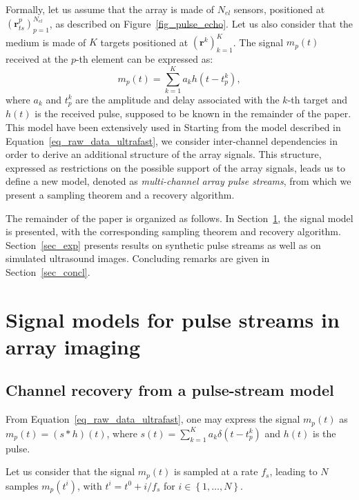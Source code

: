 \documentclass{article}
\newcommand{\vect}[1]{\bm{#1}}
\newcommand{\ser}[2]{#1^{#2}}
\theoremstyle{definition}
\begin{document}
Formally, let us assume that the array is made of $N_{el}$ sensors, positioned at $\left(\ser{\vect{r}_{ts}}{p}\right)_{p=1}^{N_{el}}$, as described on Figure~\ref{fig_pulse_echo}. 
Let us also consider that the medium is made of $K$ targets positioned at $\left(\vect{r}^k\right)_{k=1}^K$. The signal $m_{p} \left(t\right)$ received at the $p$-th element can be expressed as:
\begin{equation}
\label{eq_raw_data}
m_{p} \left(t\right) = \sum \limits_{k=1}^{K} a_k h\left(t - \ser{t_p}{k}\right), 
\end{equation}
where $a_k$ and $\ser{t_p}{k}$ are the amplitude and delay associated with the $k$-th target and $h\left(t\right)$ is the received pulse, supposed to be known in the remainder of the paper. 
This model have been extensively used in 
Starting from the model described in Equation~\eqref{eq_raw_data_ultrafast}, we consider inter-channel dependencies in order to derive an additional structure of the array signals. This structure, expressed as restrictions on the possible support of the array signals, leads us to define a new model, denoted as \textit{multi-channel array pulse streams}, from which we present a sampling theorem and a recovery algorithm.

The remainder of the paper is organized as follows. In Section~\ref{sec_pulsestreams_US}, the signal model is presented, with the corresponding sampling theorem and recovery algorithm. Section~\ref{sec_exp} presents results on synthetic pulse streams as well as on simulated ultrasound images. Concluding remarks are given in Section~\ref{sec_concl}.

\section{Signal models for pulse streams in array imaging}
\label{sec_pulsestreams_US}
\subsection{Channel recovery from a pulse-stream model}
\label{subsec_US_pulsestream}
From Equation~\eqref{eq_raw_data_ultrafast}, one may express the signal $m_p\left(t\right)$ as $m_p\left(t\right) = \left(s \ast h\right)\left(t\right)$, where $s \left(t\right) = \sum \limits_{k=1}^{K} a_k \delta\left(t - \ser{t_p}{k}\right)$ and $h\left(t\right)$ is the pulse. 

Let us consider that the signal $m_p \left(t\right)$ is sampled at a rate $f_s$, leading to $N$ samples $ m_p \left(\ser{t}{i}\right)$, with $\ser{t}{i}= \ser{t}{0} + i/f_s$ for $i \in \left\lbrace 1,\dots,N \right\rbrace$.
\end{document}
